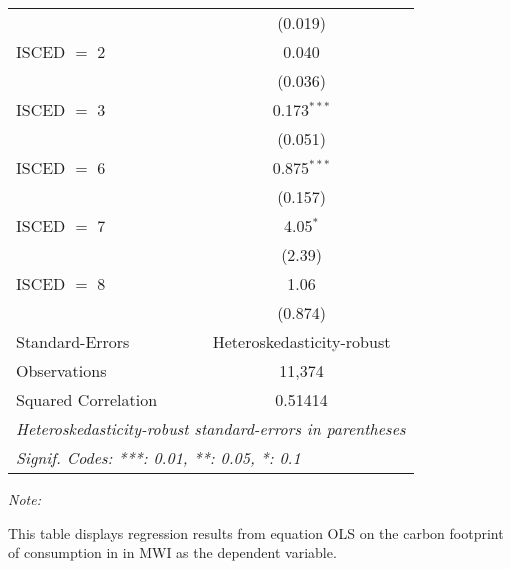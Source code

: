 \begin{table}[htbp!]
\begin{adjustbox}{width = 1\textwidth, max height = 0.95\textheight, center}
\begin{threeparttable}[b]
\begin{tabular}{lc}
                                & (0.019)\\   
            ISCED $=$ 2         & 0.040\\   
                                & (0.036)\\   
            ISCED $=$ 3         & 0.173$^{***}$\\   
                                & (0.051)\\   
            ISCED $=$ 6         & 0.875$^{***}$\\   
                                & (0.157)\\   
            ISCED $=$ 7         & 4.05$^{*}$\\   
                                & (2.39)\\   
            ISCED $=$ 8         & 1.06\\   
                                & (0.874)\\   
            \midrule 
            Standard-Errors     & Heteroskedasticity-robust \\   
            Observations        & 11,374\\  
            Squared Correlation & 0.51414\\  
            \midrule \midrule
            \multicolumn{2}{l}{\emph{Heteroskedasticity-robust standard-errors in parentheses}}\\
            \multicolumn{2}{l}{\emph{Signif. Codes: ***: 0.01, **: 0.05, *: 0.1}}\\
         \end{tabular}
         
         \begin{tablenotes}\item \medskip \textit{Note:}
            \item This table displays regression results from equation OLS on the carbon footprint of consumption in  in MWI as the dependent variable.  
         \end{tablenotes}
      \end{threeparttable}
   \end{adjustbox}
\end{table}


